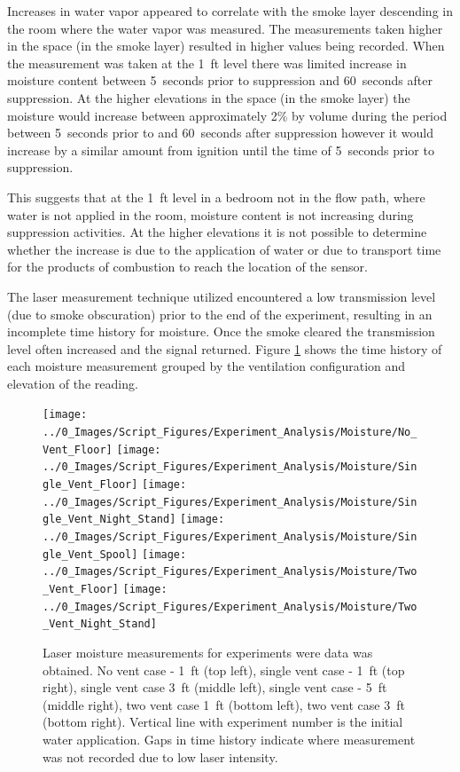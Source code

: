 \documentclass[12pt,oneside]{book}
\begin{document}
Increases in water vapor appeared to correlate with the smoke layer descending in the room where the water vapor was measured. The measurements taken higher in the space (in the smoke layer) resulted in higher values being recorded. When the measurement was taken at the 1~ft level there was limited increase in moisture content between 5~seconds prior to suppression and 60~seconds after suppression. At the higher elevations in the space (in the smoke layer) the moisture would increase between approximately 2\% by volume during the period between 5~seconds prior to and 60~seconds after suppression however it would increase by a similar amount from ignition until the time of 5~seconds prior to suppression. 

This suggests that at the 1~ft level in a bedroom not in the flow path, where water is not applied in the room, moisture content is not increasing during suppression activities. At the higher elevations it is not possible to determine whether the increase is due to the application of water or due to transport time for the products of combustion to reach the location of the sensor. 

The laser measurement technique utilized encountered a low transmission level (due to smoke obscuration) prior to the end of the experiment, resulting in an incomplete time history for moisture. Once the smoke cleared the transmission level often increased and the signal returned.  Figure \ref{fig:moisture_plots} shows the time history of each moisture measurement grouped by the ventilation configuration and elevation of the reading.

\begin{figure}[H]
\centering
\texttt{[image: ../0\_Images/Script\_Figures/Experiment\_Analysis/Moisture/No\_Vent\_Floor]} 
\texttt{[image: ../0\_Images/Script\_Figures/Experiment\_Analysis/Moisture/Single\_Vent\_Floor]}
\texttt{[image: ../0\_Images/Script\_Figures/Experiment\_Analysis/Moisture/Single\_Vent\_Night\_Stand]}
\texttt{[image: ../0\_Images/Script\_Figures/Experiment\_Analysis/Moisture/Single\_Vent\_Spool]}
\texttt{[image: ../0\_Images/Script\_Figures/Experiment\_Analysis/Moisture/Two\_Vent\_Floor]}
\texttt{[image: ../0\_Images/Script\_Figures/Experiment\_Analysis/Moisture/Two\_Vent\_Night\_Stand]}
\caption[Laser Moisture Measurements]{Laser moisture measurements for experiments were data was obtained. No vent case - 1~ft (top left), single vent case - 1~ft (top right), single vent case 3~ft (middle left), single vent case - 5~ft (middle right), two vent case 1~ft (bottom left), two vent case 3~ft (bottom right). Vertical line with experiment number is the initial water application. Gaps in time history indicate where measurement was not recorded due to low laser intensity.}
\label{fig:moisture_plots}
\end{figure}
\end{document}
